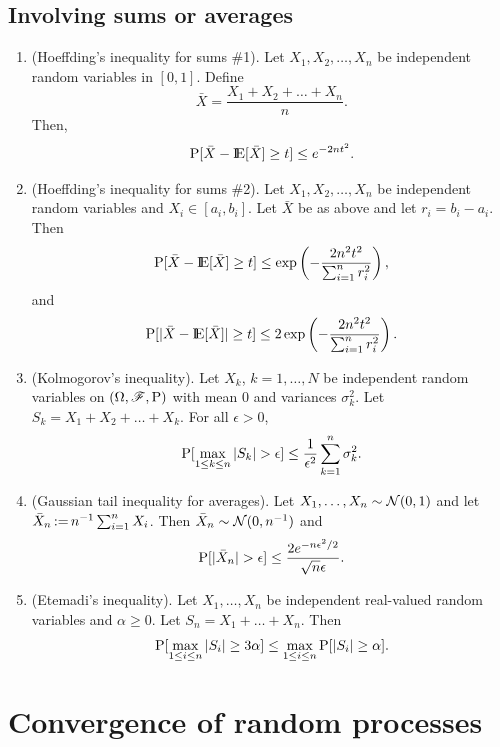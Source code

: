 \documentclass[a4paper,10pt]{article}
\begin{document}
\subsection{Involving sums or averages}
\begin{enumerate}
 \item (Hoeffding's inequality for sums \#1). Let $X_1,X_2,\ldots, X_n$ be independent random variables in $[0,1]$. Define 
  \[
  \bar{X} = \frac{X_1 + X_2 + \ldots + X_n}{n}.
  \]
  Then,
  \[
  \prob[\bar{X} - \E[\bar{X}] \geq t] \leq e^{-2nt^2}.
  \]
\item (Hoeffding's inequality for sums \#2). Let $X_1,X_2,\ldots, X_n$ be independent random variables and $X_i\in [a_i, b_i]$.
  Let $\bar{X}$ be as above and let $r_i = b_i - a_i$. Then
  \[
  \prob[\bar{X} - \E[\bar{X}] \geq t] \leq \exp\left({-\frac{2n^2t^2}{\sum_{i=1}^{n} r_i^2}}\right),
  \]
  and
  \[
  \prob[ |\bar{X} - \E[\bar{X}]| \geq t] \leq 2 \exp\left({-\frac{2n^2t^2}{\sum_{i=1}^{n} r_i^2}}\right).
  \]
\item (Kolmogorov's inequality). Let $X_k$, $k=1,\ldots, N$ be independent random variables on $(\Omega,\mathscr{F},\mathrm{P})$
      with mean $0$ and variances $\sigma_k^2$. Let $S_k = X_1 + X_2 + \ldots + X_k$. For all $\epsilon>0$,
      \[
       \prob[\max_{1\leq k\leq n}|S_k|>\epsilon] \leq \frac{1}{\epsilon^2}\sum_{k=1}^{n}\sigma_k^2.
      \]
\item (Gaussian tail inequality for averages). Let $X_1,\ldots,X_n\sim \mathcal N(0,1)$ and 
      let $\bar{X}_n {}\mathop{\mathrel{:}=}{} n^{-1}\sum_{i=1}^{n}X_i$. Then $\bar{X}_n\sim \mathcal N(0,n^{-1})$ and
      \[
       \prob[|\bar{X}_n|>\epsilon] \leq \frac{2e^{-n\epsilon^2/2}}{\sqrt{n}\epsilon}.
      \]
\item (Etemadi's inequality). Let $X_1,\ldots, X_n$ be independent real-valued random variables and $\alpha\geq 0$.
      Let $S_n = X_1 + \ldots + X_n$. Then
      \[
       \mathrm{P}[\max_{1\leq i \leq n}|S_i|\geq 3\alpha]\leq \max_{1\leq i \leq n}\mathrm{P}[|S_i|\geq \alpha].
      \]

\end{enumerate}


\section{Convergence of random processes}
\end{document}
